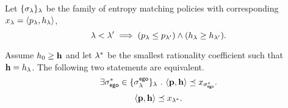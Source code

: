 \begin{lemma}
  Let $\{\sigma_\lambda\}_\lambda$ be the family of entropy matching policies
  with corresponding $x_\lambda = \langle p_\lambda, h_\lambda\rangle$,
  \begin{equation}
  \lambda < \lambda' \implies (p_{\lambda} \leq p_{\lambda'}) \wedge (h_\lambda \geq h_{\lambda'}).
  \end{equation}
\end{lemma}
\begin{corollary}\label{cor:termination}
  Assume $h_0 \geq \mathbf{h}$ and
  let $\lambda^*$ be the smallest rationality coefficient such that $\mathbf{h} = h_\lambda$.
  The following two statements are equivalent.
  \begin{equation}
       \exists \sigma_{\mathsf{ego}}^* \in \{\sigma^{\mathsf{ego}}_\lambda\}_\lambda~.~  \langle \mathbf{p}, \mathbf{h} \rangle \preceq x_{\sigma_{\mathsf{ego}}^*}.
  \end{equation}
  \begin{equation}
    \langle \mathbf{p}, \mathbf{h} \rangle \preceq x_{\lambda^*}.
  \end{equation}
\end{corollary}
